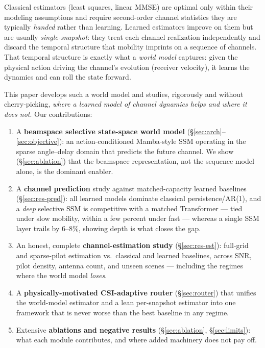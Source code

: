 \documentclass[11pt]{article}
\begin{document}
Classical estimators (least squares, linear MMSE) are optimal only within their modeling assumptions
and require second-order channel statistics they are typically \emph{handed} rather than learning.
Learned estimators improve on them but are usually \emph{single-snapshot}: they treat each channel
realization independently and discard the temporal structure that mobility imprints on a sequence of
channels. That temporal structure is exactly what a \emph{world model} captures: given the physical
action driving the channel's evolution (receiver velocity), it learns the dynamics and can roll the
state forward.

This paper develops such a world model and studies, rigorously and without cherry-picking, \emph{where
a learned model of channel dynamics helps and where it does not}. Our contributions:

\begin{enumerate}[leftmargin=1.6em,itemsep=2pt]
\item A \textbf{beamspace selective state-space world model} (\S\ref{sec:arch}--\ref{sec:objective}):
an action-conditioned Mamba-style SSM operating in the sparse angle--delay domain that predicts the
future channel. We show (\S\ref{sec:ablation}) that the beamspace representation, not the sequence
model alone, is the dominant enabler.
\item A \textbf{channel prediction} study against matched-capacity learned baselines
(\S\ref{sec:res-pred}): all learned models dominate classical persistence/AR(1), and a \emph{deep}
selective SSM is competitive with a matched Transformer --- tied under slow mobility, within a few
percent under fast --- whereas a single SSM layer trails by $6$--$8\%$, showing depth is what closes
the gap.
\item An honest, complete \textbf{channel-estimation study} (\S\ref{sec:res-est}): full-grid and
sparse-pilot estimation vs.\ classical and learned baselines, across SNR, pilot density, antenna
count, and unseen scenes --- including the regimes where the world model \emph{loses}.
\item A \textbf{physically-motivated CSI-adaptive router} (\S\ref{sec:router}) that unifies the
world-model estimator and a lean per-snapshot estimator into one framework that is never worse than
the best baseline in any regime.
\item Extensive \textbf{ablations and negative results} (\S\ref{sec:ablation}, \S\ref{sec:limits}):
what each module contributes, and where added machinery does not pay off.
\end{enumerate}
\end{document}
